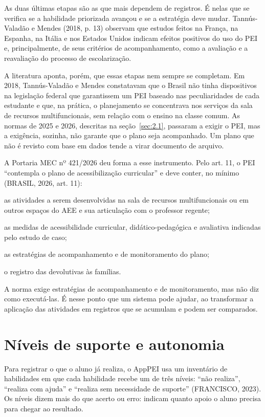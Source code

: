 As duas últimas etapas são as que mais dependem de registros. É nelas que se verifica se a habilidade priorizada avançou e se a estratégia deve mudar. Tannús-Valadão e Mendes (2018, p. 13) observam que estudos feitos na França, na Espanha, na Itália e nos Estados Unidos indicam efeitos positivos do uso do PEI e, principalmente, de seus critérios de acompanhamento, como a avaliação e a reavaliação do processo de escolarização.

A literatura aponta, porém, que essas etapas nem sempre se completam. Em 2018, Tannús-Valadão e Mendes constatavam que o Brasil não tinha dispositivos na legislação federal que garantissem um PEI baseado nas peculiaridades de cada estudante e que, na prática, o planejamento se concentrava nos serviços da sala de recursos multifuncionais, sem relação com o ensino na classe comum. As normas de 2025 e 2026, descritas na seção~\ref{sec:2.1}, passaram a exigir o PEI, mas a exigência, sozinha, não garante que o plano seja acompanhado. Um plano que não é revisto com base em dados tende a virar documento de arquivo.

A Portaria MEC nº 421/2026 deu forma a esse instrumento. Pelo art. 11, o PEI “contempla o plano de acessibilização curricular” e deve conter, no mínimo (BRASIL, 2026, art. 11):

\begin{alineasIFTO}
  \item as atividades a serem desenvolvidas na sala de recursos multifuncionais ou em outros espaços do AEE e sua articulação com o professor regente;
  \item as medidas de acessibilidade curricular, didático-pedagógica e avaliativa indicadas pelo estudo de caso;
  \item as estratégias de acompanhamento e de monitoramento do plano;
  \item o registro das devolutivas às famílias.
\end{alineasIFTO}

A norma exige estratégias de acompanhamento e de monitoramento, mas não diz como executá-las. É nesse ponto que um sistema pode ajudar, ao transformar a aplicação das atividades em registros que se acumulam e podem ser comparados.

\section{Níveis de suporte e autonomia}\label{sec:2.3}

Para registrar o que o aluno já realiza, o AppPEI usa um inventário de habilidades em que cada habilidade recebe um de três níveis: “não realiza”, “realiza com ajuda” e “realiza sem necessidade de suporte” (FRANCISCO, 2023). Os níveis dizem mais do que acerto ou erro: indicam quanto apoio o aluno precisa para chegar ao resultado.

